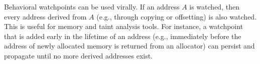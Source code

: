\documentclass[letterpaper,twocolumn,10pt]{article}
\begin{document}

Behavioral watchpoints can be used virally. If an address $A$ is watched, then every address derived from $A$ (e.g., through copying or offsetting) is also watched. This is useful for memory and taint analysis tools. For instance, a watchpoint that is added early in the lifetime of an address (e.g., immediately before the address of newly allocated memory is returned from an allocator) can persist and propagate until no more derived addresses exist.




\end{document}
